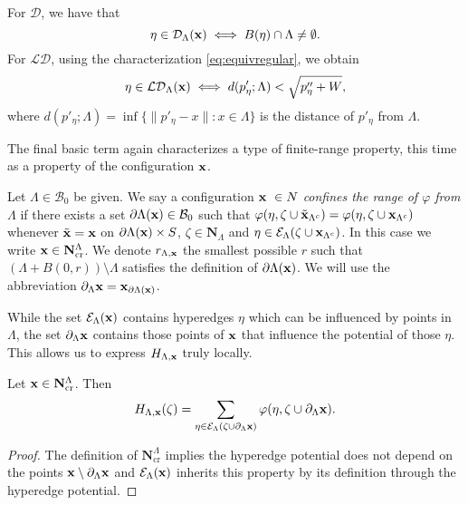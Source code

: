 \begin{remark} 
	For $\mathcal D$, we have that 
	$$\eta \in \mathcal D_\Lambda({\mathbf{x}})\iff B(\eta) \cap \Lambda \neq \emptyset.$$ 
	For $\mathcal {LD}$, using the characterization \eqref{eq:equivregular}, we obtain 
	$$\eta \in \mathcal {LD}_\Lambda({\mathbf{x}}) \iff d(p'_\eta;\Lambda) < \sqrt{p''_\eta + W},$$
	where $d(p'_\eta;\Lambda) = \inf\{\|p'_\eta - x\|: x \in \Lambda\}$ is the distance of $p'_\eta$ from $\Lambda$.    
\end{remark}

The final basic term again characterizes a type of finite-range property, this time as a property of the configuration ${\mathbf{x}}$.

\begin{definition}\label{def:cr}
	Let $\Lambda \in \mathcal B_0$ be given. We say a configuration ${\mathbf{x}}\ \in N$ \textit{confines the range of $\varphi$ from $\Lambda$} if there exists a set $\partial \Lambda({\mathbf{x}}) \in \mathcal B_0$ such that $\varphi(\eta,\zeta \cup \tilde{{\mathbf{x}}}_{\Lambda^c}) = \varphi(\eta,\zeta\cup{\mathbf{x}}_{\Lambda^c})$ whenever $\tilde{{\mathbf{x}}} = {\mathbf{x}}$ on $\partial \Lambda({\mathbf{x}})\times S$, $\zeta \in \mathbf N_\Lambda$ and $\eta \in \mathcal E_\Lambda(\zeta\cup{\mathbf{x}}_{\Lambda^c})$. In this case we write ${\mathbf{x}} \in \mathbf N^\Lambda_\mathrm{cr}$. We denote $r_{\Lambda,{\mathbf{x}}}$ the smallest possible $r$ such that $(\Lambda + B(0,r))\setminus \Lambda$ satisfies the definition of $\partial \Lambda({\mathbf{x}})$. We will use the abbreviation $\partial_\Lambda {\mathbf{x}} = {\mathbf{x}}_{\partial \Lambda({\mathbf{x}})}$.
\end{definition}

While the set $\mathcal E_\Lambda({\mathbf{x}})$ contains hyperedges $\eta$ which can be influenced by points in $\Lambda$, the set $\partial_\Lambda {\mathbf{x}}$  contains those points of ${\mathbf{x}}$ that influence the potential of those $\eta$. This allows us to express $H_{\Lambda,{\mathbf{x}}}$ truly locally.

\begin{proposition}\label{prop:Hcr}Let ${\mathbf{x}}\in \mathbf N^\Lambda_\mathrm{cr}$. Then 
	$$H_{\Lambda,{\mathbf{x}}}(\zeta) = \sum_{\eta \in \mathcal E_\Lambda(\zeta \cup \partial_\Lambda {\mathbf{x}})} \varphi(\eta, \zeta \cup \partial_\Lambda {\mathbf{x}}).$$
\end{proposition}
\begin{proof} The definition of $\mathbf N^\Lambda_\mathrm{cr}$ implies the hyperedge potential does not depend on the points ${\mathbf{x}} \setminus \partial_\Lambda {\mathbf{x}}$ and $\mathcal E_\Lambda({\mathbf{x}})$ inherits this property by its definition through the hyperedge potential.
\end{proof}



